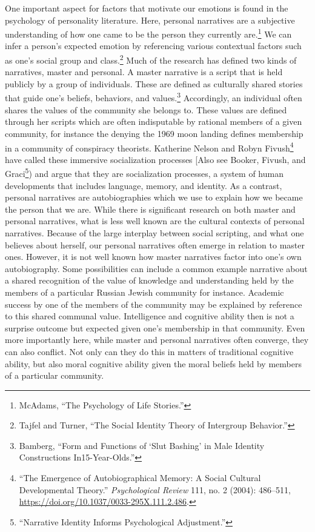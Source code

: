 \documentclass[phdthesis,12pt,final]{wuthesis}
\theoremstyle{definition}
\theoremstyle{definition}
\theoremstyle{definition}
\theoremstyle{definition}
\theoremstyle{remark}
\begin{document}
One important aspect for factors that motivate our emotions is found in the psychology of personality literature. Here, personal narratives are a subjective understanding of how one came to be the person they currently are.\footnote{McAdams, {``The {Psychology} of {Life Stories}.''}} We can infer a person's expected emotion by referencing various contextual factors such as one's social group and class.\footnote{Tajfel and Turner, {``The {Social Identity Theory} of {Intergroup Behavior}.''}} Much of the research has defined two kinds of narratives, master and personal. A master narrative is a script that is held publicly by a group of individuals. These are defined as culturally shared stories that guide one's beliefs, behaviors, and values.\footnote{Bamberg, {``Form and {Functions} of {`{Slut Bashing}'} in {Male Identity Constructions} In15-{Year-Olds}.''}} Accordingly, an individual often shares the values of the community she belongs to. These values are defined through her scripts which are often indisputable by rational members of a given community, for instance the denying the 1969 moon landing defines membership in a community of conspiracy theorists. Katherine Nelson and Robyn Fivush\footnote{{``The {Emergence} of {Autobiographical Memory}: {A Social Cultural Developmental Theory}.''} \emph{Psychological Review} 111, no. 2 (2004): 486--511, \url{https://doi.org/10.1037/0033-295X.111.2.486}.} have called these immersive socialization processes {[}Also see Booker, Fivush, and Graci\footnote{{``Narrative Identity Informs Psychological Adjustment.''}}) and argue that they are socialization processes, a system of human developments that includes language, memory, and identity. As a contrast, personal narratives are autobiographies which we use to explain how we became the person that we are. While there is significant research on both master and personal narratives, what is less well known are the cultural contexts of personal narratives. Because of the large interplay between social scripting, and what one believes about herself, our personal narratives often emerge in relation to master ones. However, it is not well known how master narratives factor into one's own autobiography. Some possibilities can include a common example narrative about a shared recognition of the value of knowledge and understanding held by the members of a particular Russian Jewish community for instance. Academic success by one of the members of the community may be explained by reference to this shared communal value. Intelligence and cognitive ability then is not a surprise outcome but expected given one's membership in that community. Even more importantly here, while master and personal narratives often converge, they can also conflict. Not only can they do this in matters of traditional cognitive ability, but also moral cognitive ability given the moral beliefs held by members of a particular community.
\end{document}
